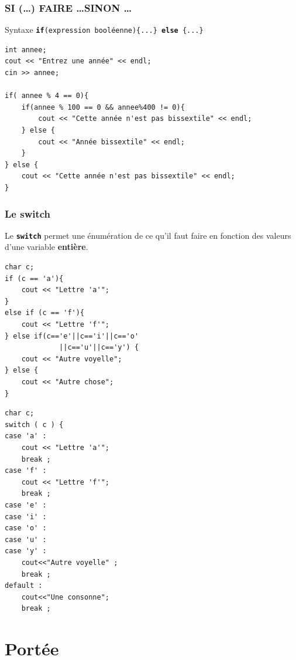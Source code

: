 \begin{frame}[fragile]
	\frametitle{SI (\dots) FAIRE \dots SINON \dots}
	\begin{block}{Syntaxe}
		\centering
		\texttt{\textbf{if}(expression booléenne)\{...\} \textbf{else} \{...\}}
	\end{block}
	\begin{verbatim}
int annee;
cout << "Entrez une année" << endl;
cin >> annee;

if( annee % 4 == 0){
    if(annee % 100 == 0 && annee%400 != 0){
        cout << "Cette année n'est pas bissextile" << endl;
    } else {
        cout << "Année bissextile" << endl;
    }
} else {
    cout << "Cette année n'est pas bissextile" << endl;
}
	\end{verbatim}
\end{frame}

\begin{frame}[fragile]
	\frametitle{Le switch}
	Le \texttt{\textbf{switch}} permet une énumération de ce qu'il faut faire en fonction des valeurs d'une variable \textbf{entière}.
    \vspace{-0.3em}
	\begin{minipage}{0.47\linewidth}
		\begin{verbatim}
char c;
if (c == 'a'){
    cout << "Lettre 'a'";
}
else if (c == 'f'){
    cout << "Lettre 'f'";
} else if(c=='e'||c=='i'||c=='o'
             ||c=='u'||c=='y') {
    cout << "Autre voyelle";
} else {
    cout << "Autre chose";
}
		\end{verbatim}
	\end{minipage}
	\hfill
	\begin{minipage}{0.47\linewidth}
		\begin{verbatim}
char c;
switch ( c ) {
case 'a' :
    cout << "Lettre 'a'";
    break ;
case 'f' :
    cout << "Lettre 'f'";
    break ;
case 'e' :
case 'i' :
case 'o' :
case 'u' :
case 'y' :
    cout<<"Autre voyelle" ;
    break ;
default :
    cout<<"Une consonne";
    break ;
		\end{verbatim}
	\end{minipage}
\end{frame}

\section{Portée}

